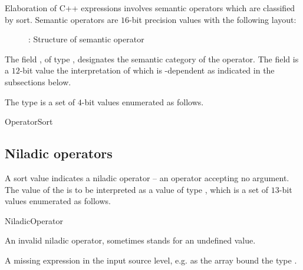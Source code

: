 Elaboration of C++ expressions involves semantic operators which are classified
by sort. Semantic operators are $16$-bit precision values with the following
layout:
%
\begin{figure}[H]
	\centering
	  \begin{BasicAbstractReferenceLayout}{16}
	  \end{BasicAbstractReferenceLayout} 
	  \caption{: Structure of semantic operator}
	  \label{fig:ifc-semantic-operator}
\end{figure}
%

The field , of type , designates the semantic category
of the operator.  The field  is a $12$-bit value the 
interpretation of which is -dependent as indicated in the 
subsections below.

The type  is a set of $4$-bit values enumerated as follows.
\begin{Enumeration}{OperatorSort}
	
	\setcounter{enumi}{13}
\end{Enumeration}

\subsection{Niladic operators}
\label{sec:ifc:OperatorSort:Niladic}

A sort value  indicates a niladic operator -- 
an operator accepting no argument.  The
value of the  is to be interpreted as a value of type 
, which is a set of $13$-bit values enumerated as follows.
%
\begin{Enumeration}{NiladicOperator}

	\setcounter{enumi}{1023}
\end{Enumeration}

An invalid niladic operator, sometimes stands for an undefined value.

A missing expression in the input source level, e.g. as the array bound the type .

